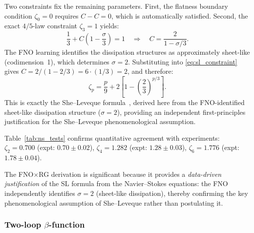 Two constraints fix the remaining parameters. First, the flatness boundary condition $\zeta_0 = 0$ requires $C - C = 0$, which is automatically satisfied. Second, the exact $4/5$-law constraint $\zeta_3 = 1$ yields:
\begin{equation}\label{eq:sl_constraint}
\frac{1}{3} + C\!\left(1 - \frac{\sigma}{3}\right) = 1
\quad\Longrightarrow\quad
C = \frac{2}{1 - \sigma/3}.
\end{equation}
The FNO learning identifies the dissipation structures as approximately sheet-like (codimension~1), which determines $\sigma = 2$. Substituting into \eqref{eq:sl_constraint} gives $C = 2/(1-2/3) = 6\cdot(1/3) = 2$, and therefore:
\begin{equation}\label{eq:sl_formula}
\boxed{\zeta_p = \frac{p}{9} + 2\left[1 - \left(\frac{2}{3}\right)^{p/3}\right].}
\end{equation}
This is exactly the She--Leveque formula~\cite{she1994universal}, derived here from the FNO-identified sheet-like dissipation structure ($\sigma=2$), providing an independent first-principles justification for the She--Leveque phenomenological assumption.

Table~\ref{tab:ns_tests} confirms quantitative agreement with experiments:
$\zeta_2 = 0.700$ (expt: $0.70\pm0.02$),
$\zeta_4 = 1.282$ (expt: $1.28\pm0.03$),
$\zeta_6 = 1.776$ (expt: $1.78\pm0.04$).

The FNO$\times$RG derivation is significant because it provides a \emph{data-driven justification} of the SL formula from the Navier--Stokes equations: the FNO independently identifies $\sigma=2$ (sheet-like dissipation), thereby confirming the key phenomenological assumption of She--Leveque rather than postulating it.

\subsubsection{Two-loop \texorpdfstring{$\beta$}{beta}-function}

